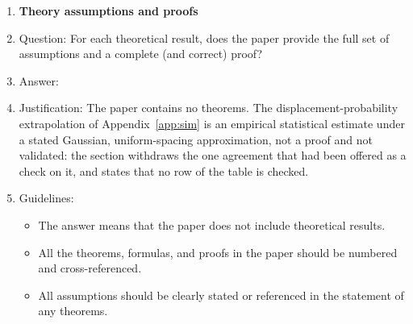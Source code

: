 \documentclass{article}
\begin{document}
\begin{enumerate}
\item {\bf Theory assumptions and proofs}
    \item[] Question: For each theoretical result, does the paper provide the full set of assumptions and a complete (and correct) proof?
    \item[] Answer: \answerNA{}
    \item[] Justification: The paper contains no theorems. The displacement-probability extrapolation of Appendix~\ref{app:sim} is an empirical statistical estimate under a stated Gaussian, uniform-spacing approximation, not a proof and not validated: the section withdraws the one agreement that had been offered as a check on it, and states that no row of the table is checked.
    \item[] Guidelines:
    \begin{itemize}
        \item The answer \answerNA{} means that the paper does not include theoretical results.
        \item All the theorems, formulas, and proofs in the paper should be numbered and cross-referenced.
        \item All assumptions should be clearly stated or referenced in the statement of any theorems.
    \end{itemize}


\end{enumerate}
\end{document}

